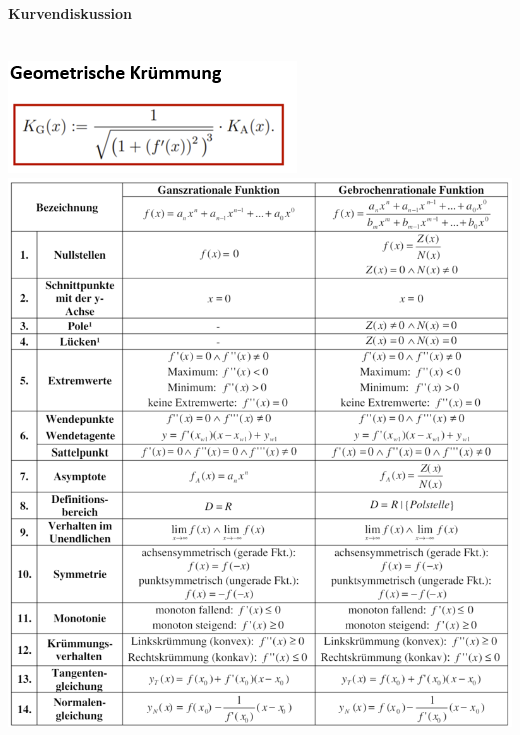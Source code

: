 \paragraph{Kurvendiskussion}\mbox{}\\
\noindent
\includegraphics[width=\columnwidth]{./images/kurv.png}
\includegraphics[width=\columnwidth]{./images/kurv1.png}
\vspace{1mm}

